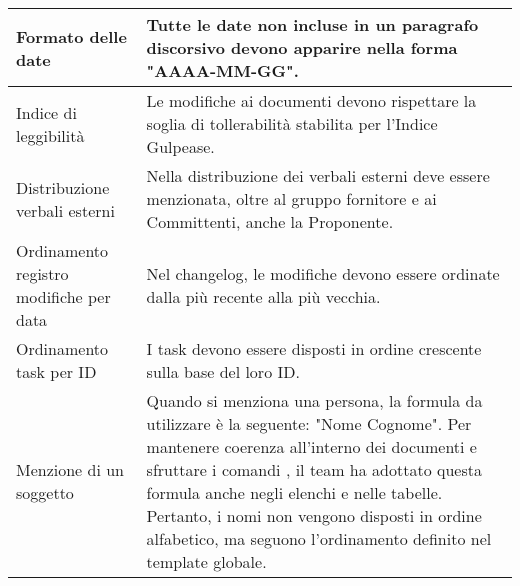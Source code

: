 \begin{adjustwidth}{-0.5cm}{-0.5cm}
\begin{longtable}{|P{4.5cm}|>{\raggedright\arraybackslash}P{9cm}|}
    \hline Formato delle date & Tutte le date non incluse in un paragrafo discorsivo devono apparire nella forma "AAAA-MM-GG".\\
    \hline Indice di leggibilità & Le modifiche ai documenti devono rispettare la soglia di tollerabilità stabilita per l'Indice Gulpease.\\
    \hline Distribuzione verbali esterni & Nella distribuzione dei verbali esterni deve essere menzionata, oltre al gruppo fornitore e ai Committenti, anche la Proponente.\\
    \hline Ordinamento registro modifiche per data & Nel changelog, le modifiche devono essere ordinate dalla più recente alla più vecchia.\\
    \hline Ordinamento task per ID & I task devono essere disposti in ordine crescente sulla base del loro ID. \\
    \hline Menzione di un soggetto & Quando si menziona una persona, la formula da utilizzare è la seguente: "Nome Cognome". Per mantenere coerenza all’interno dei documenti e sfruttare i comandi , il team ha adottato questa formula anche negli elenchi e nelle tabelle. Pertanto, i nomi non vengono disposti in ordine alfabetico, ma seguono l'ordinamento definito nel template globale. \\
  \end{longtable}
\end{adjustwidth}
\egroup

